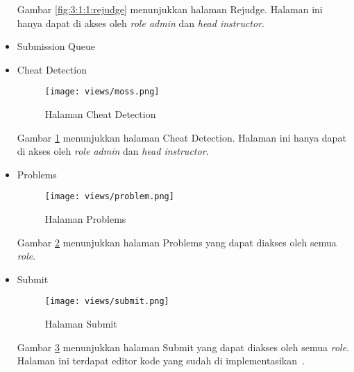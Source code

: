\begin{itemize}
            Gambar \ref{fig:3:1:1:rejudge} menunjukkan halaman Rejudge. Halaman ini hanya dapat di akses oleh \textit{role admin} dan \textit{head instructor}.

      \item Submission Queue

      \item Cheat Detection
            \begin{figure}[H]
                  \centering
                  \texttt{[image: views/moss.png]}
                  \caption{Halaman Cheat Detection}
                  \label{fig:3:1:1:moss}
            \end{figure}

            Gambar \ref{fig:3:1:1:moss} menunjukkan halaman Cheat Detection. Halaman ini hanya dapat di akses oleh \textit{role admin} dan \textit{head instructor}.

      \item Problems
            \begin{figure}[H]
                  \centering
                  \texttt{[image: views/problem.png]}
                  \caption{Halaman Problems}
                  \label{fig:3:1:1:problem}
            \end{figure}

            Gambar \ref{fig:3:1:1:problem} menunjukkan halaman Problems yang dapat diakses oleh semua \textit{role}.

      \item Submit
            \begin{figure}[H]
                  \centering
                  \texttt{[image: views/submit.png]}
                  \caption{Halaman Submit}
                  \label{fig:3:1:1:submit}
            \end{figure}

            Gambar \ref{fig:3:1:1:submit} menunjukkan halaman Submit yang dapat diakses oleh semua \textit{role}. Halaman ini terdapat editor kode yang sudah di implementasikan~\cite{nicholas:sharif}.


\end{itemize}
